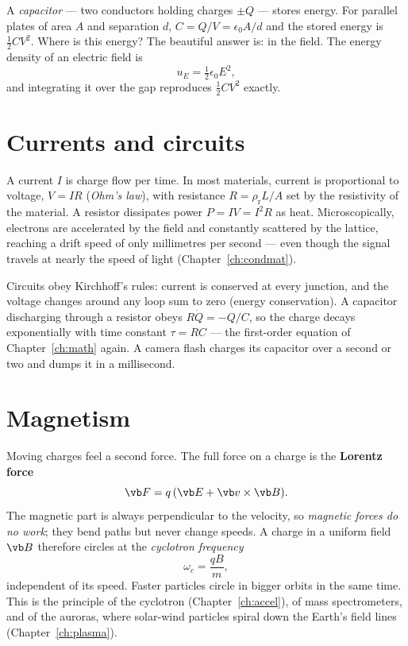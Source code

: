 A \emph{capacitor} --- two conductors holding charges $\pm Q$ --- stores energy. For parallel plates of area $A$ and separation $d$, $C = Q/V = \epsilon_0A/d$ and the stored energy is $\tfrac12CV^2$. Where is this energy? The beautiful answer is: in the field. The energy density of an electric field is
\[
  u_E = \tfrac12\epsilon_0E^2 ,
\]
and integrating it over the gap reproduces $\tfrac12CV^2$ exactly.

\section{Currents and circuits}

A current $I$ is charge flow per time. In most materials, current is proportional to voltage, $V = IR$ (\emph{Ohm's law}), with resistance $R = \rho_{\text{r}} L/A$ set by the resistivity of the material. A resistor dissipates power $P = IV = I^2R$ as heat. Microscopically, electrons are accelerated by the field and constantly scattered by the lattice, reaching a drift speed of only millimetres per second --- even though the signal travels at nearly the speed of light (Chapter~\ref{ch:condmat}).

Circuits obey Kirchhoff's rules: current is conserved at every junction, and the voltage changes around any loop sum to zero (energy conservation). A capacitor discharging through a resistor obeys $R\dot Q = -Q/C$, so the charge decays exponentially with time constant $\tau = RC$ --- the first-order equation of Chapter~\ref{ch:math} again. A camera flash charges its capacitor over a second or two and dumps it in a millisecond.

\section{Magnetism}

Moving charges feel a second force. The full force on a charge is the \textbf{Lorentz force}
\[
  \vb F = q\,(\vb E + \vb v\times\vb B).
\]
The magnetic part is always perpendicular to the velocity, so \emph{magnetic forces do no work}; they bend paths but never change speeds. A charge in a uniform field $\vb B$ therefore circles at the \emph{cyclotron frequency}
\[
  \omega_c = \frac{qB}{m},
\]
independent of its speed. Faster particles circle in bigger orbits in the same time. This is the principle of the cyclotron (Chapter~\ref{ch:accel}), of mass spectrometers, and of the auroras, where solar-wind particles spiral down the Earth's field lines (Chapter~\ref{ch:plasma}).

